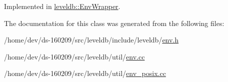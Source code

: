Implemented in \hyperlink{classleveldb_1_1_env_wrapper_ab1779dda39167eaa38e660bcc69988c4}{leveldb\+::\+Env\+Wrapper}.



The documentation for this class was generated from the following files\+:\begin{DoxyCompactItemize}
\item 
/home/dev/ds-\/160209/src/leveldb/include/leveldb/\hyperlink{env_8h}{env.\+h}\item 
/home/dev/ds-\/160209/src/leveldb/util/\hyperlink{env_8cc}{env.\+cc}\item 
/home/dev/ds-\/160209/src/leveldb/util/\hyperlink{env__posix_8cc}{env\+\_\+posix.\+cc}\end{DoxyCompactItemize}
